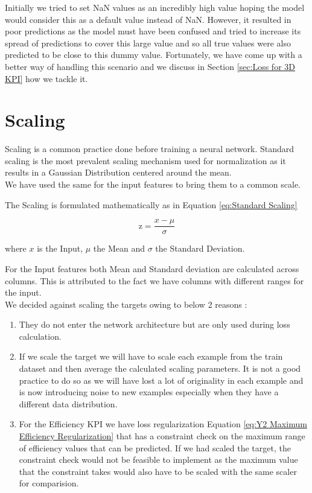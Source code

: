 \documentclass{report} %
\begin{document}
Initially we tried to set \ac{NaN} values as an incredibly high value hoping the model would consider this as a default value instead of \ac{NaN}.
However, it resulted in poor predictions as the model must have been confused and tried to increase its spread of predictions to cover this large value and so all true values were also predicted to be close to this dummy value.
Fortunately, we have come up with a better way of handling this scenario and we discuss in Section \ref{sec:Loss for 3D KPI} how we tackle it.

\section{Scaling}\label{sec:Scaling}

Scaling is a common practice done before training a neural network. 
Standard scaling is the most prevalent scaling mechanism used for normalization as it results in a Gaussian Distribution centered around the mean. \\
We have used the same for the input features to bring them to a common scale. 

The Scaling is formulated mathematically as in Equation \ref{eq:Standard Scaling}

\begin{equation}
    \text{z} = \frac{x - \mu}{\sigma}
    \label{eq:Standard Scaling}
\end{equation} 

where $x$ is the Input, $\mu$ the Mean and $\sigma$ the Standard Deviation.

For the Input features both Mean and Standard deviation are calculated across columns. This is attributed to the fact we have columns with different ranges for the input.\\ 

We decided against scaling the targets owing to below 2 reasons :
\begin{enumerate}
    \item They do not enter the network architecture but are only used during loss calculation.
    \item If we scale the target we will have to scale each example from the train dataset and then average the calculated scaling parameters.
    It is not a good practice to do so as we will have lost a lot of originality in each example and is now introducing noise to new examples especially when they have a different data distribution.
    \item For the Efficiency \ac{KPI} we have loss regularization Equation \ref{eq:Y2 Maximum Efficiency Regularization} that has a constraint 
    check on the maximum range of efficiency values that can be predicted. If we had scaled the target, the constraint check would not be feasible to 
    implement as the maximum value that the constraint takes would also have to be scaled with the same scaler for comparision.
    
\end{enumerate}
\end{document}

